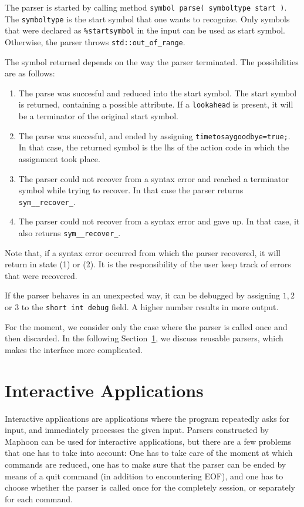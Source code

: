 \documentclass{article}
\begin{document}
The parser is started by calling method
\verb+symbol parse( symboltype start )+.
The \verb+symboltype+ is the start symbol that one wants to recognize.
Only symbols that were declared as \verb+%startsymbol+ in the input
can be used as start symbol. Otherwise, the parser 
throws \verb+std::out_of_range+. 

The symbol returned depends on the way the parser
terminated. The possibilities are as follows: 
\begin{enumerate}
\item
   The parse was succesful and reduced into the start symbol. 
   The start symbol is returned, containing a possible attribute. 
   If a \verb+lookahead+ is present, it will be a terminator
   of the original start symbol. 
\item
   The parse was succesful, and ended by assigning
   \verb+timetosaygoodbye=true;+.
   In that case, the returned symbol is the lhs of the 
   action code in which the assignment took place.  
\item
   The parser could not recover from a syntax error and reached
   a terminator symbol while trying to recover. In that
   case the parser returns \verb+sym__recover_+. 
\item
   The parser could not recover from a syntax error and gave up.
   In that case, it also returns \verb+sym__recover_+. 
\end{enumerate}

\noindent
Note that, if a syntax error occurred from which the parser 
recovered, it will return in state (1) or (2). It is the responsibility
of the user keep track of errors that were recovered. 

If the parser behaves in an unexpected way, it can be
debugged by assigning $ 1,2 $ or $ 3 $ to the \verb+short int debug+ field. 
A higher number results in more output. 

For the moment, we consider only the case where the parser is 
called once and then discarded. In the following 
Section~\ref{Sect_interactive}, we discuss reusable 
parsers, which makes the interface more complicated. 

\section{Interactive Applications}
\label{Sect_interactive}

Interactive applications are applications where the
program repeatedly asks for input, and immediately processes the 
given input.
Parsers constructed by Maphoon can be used
for interactive applications,
but there are a few problems that one has to take into account: 
One has to take care of the moment at which commands are reduced, 
one has to make sure that the parser can be ended by means of a
quit command (in addition to encountering EOF), and one 
has to choose whether the parser is called once for the completely 
session, or separately for each command. 
\end{document}
